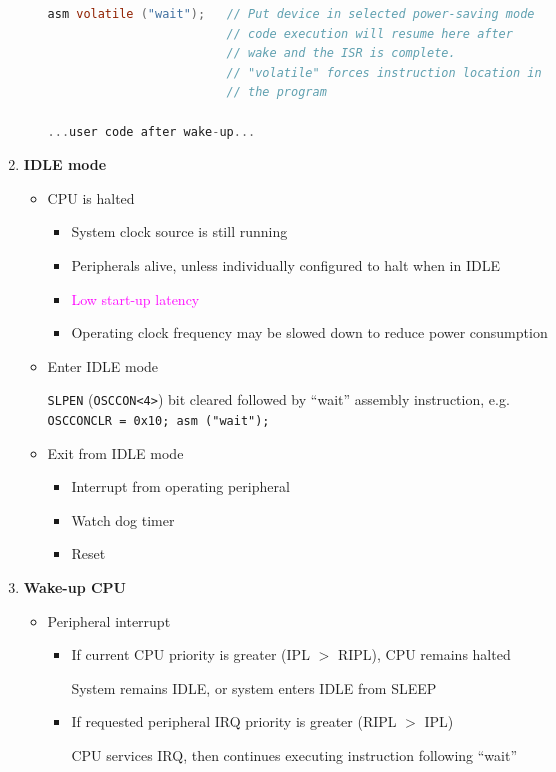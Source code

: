 \documentclass[a4paper]{article}
\begin{document}
\begin{enumerate}[label = \arabic*.]
\begin{itemize}[leftmargin = 1cm]
\begin{lstlisting}[language=c]
asm volatile ("wait");   // Put device in selected power-saving mode
                         // code execution will resume here after
                         // wake and the ISR is complete.
                         // "volatile" forces instruction location in
                         // the program

...user code after wake-up...
        \end{lstlisting}
      \end{itemize}

    \item \textbf{IDLE mode}
      \begin{itemize}[leftmargin = 1cm]
        \item CPU is halted
          \begin{itemize}[leftmargin = 1cm]
            \item System clock source is still running
            \item Peripherals alive, unless individually configured to halt when in IDLE
            \item \textcolor{magenta}{Low start-up latency}
            \item Operating clock frequency may be slowed down to reduce power consumption
          \end{itemize}
        \item Enter IDLE mode
          \par \verb|SLPEN| (\verb|OSCCON<4>|) bit cleared followed by “wait” assembly instruction, e.g.  \\
          \verb|OSCCONCLR = 0x10; asm ("wait");|
        \item Exit from IDLE mode
          \begin{itemize}[leftmargin = 1cm]
            \item Interrupt from operating peripheral
            \item Watch dog timer
            \item Reset
          \end{itemize}
      \end{itemize}

    \item \textbf{Wake-up CPU}
      \begin{itemize}[leftmargin = 1cm]
        \item Peripheral interrupt
          \begin{itemize}[leftmargin = 1cm]
            \item If current CPU priority is greater (IPL \( > \) RIPL), CPU remains halted
              \par System remains IDLE, or system enters IDLE from SLEEP
            \item If requested peripheral IRQ priority is greater (RIPL \( > \) IPL)
              \par CPU services IRQ, then continues executing instruction following “wait”
          \end{itemize}


\end{itemize}
\end{enumerate}
\end{document}
